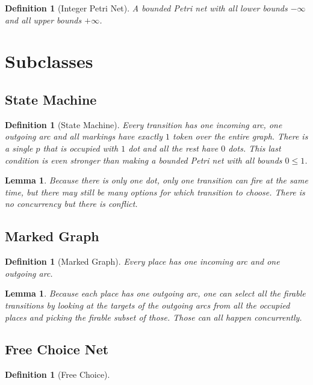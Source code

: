 \documentclass[11pt]{book}
\theoremstyle{change}
\newtheorem{definition}[equation]{Definition}
\newtheorem{lemma}[equation]{Lemma}
\theoremstyle{nonumberplain}
\numberwithin{equation}{section}
\begin{document}
\begin{definition}[Integer Petri Net]
A bounded Petri net with all lower bounds $-\infty$ and all upper bounds $+\infty$.
\end{definition}

\section{Subclasses}

\subsection{State Machine}

\begin{definition}[State Machine]
Every transition has one incoming arc, one outgoing arc and all markings have exactly $1$ token over the entire graph. There is a single $p$ that is occupied with $1$ dot and all the rest have $0$ dots. This last condition is even stronger than making a bounded Petri net with all bounds $0 \leq 1$.
\end{definition}

\begin{lemma}
Because there is only one dot, only one transition can fire at the same time, but there may still be many options for which transition to choose. There is no concurrency but there is conflict.
\end{lemma}

\subsection{Marked Graph}

\begin{definition}[Marked Graph]
Every place has one incoming arc and one outgoing arc.
\end{definition}

\begin{lemma}
Because each place has one outgoing arc, one can select all the firable transitions by looking at the targets of the outgoing arcs from all the occupied places and picking the firable subset of those. Those can all happen concurrently.
\end{lemma}

\subsection{Free Choice Net}

\begin{definition}[Free Choice]
\end{definition}
\end{document}
